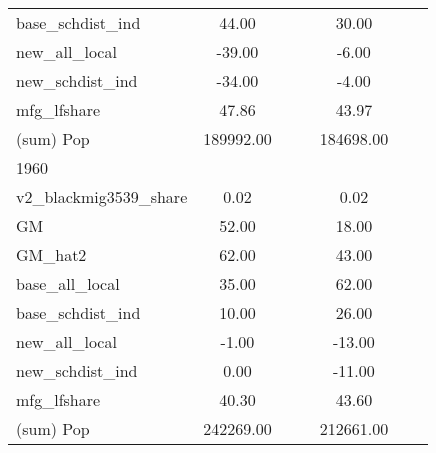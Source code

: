 \begin{table}[htbp]
\begin{tabular}{l*{2}{ccc}}
base\_schdist\_ind    &       44.00&            &            &       30.00&            &            \\
new\_all\_local       &      -39.00&            &            &       -6.00&            &            \\
new\_schdist\_ind     &      -34.00&            &            &       -4.00&            &            \\
mfg\_lfshare         &       47.86&            &            &       43.97&            &            \\
(sum) Pop           &   189992.00&            &            &   184698.00&            &            \\
\midrule
1960                &            &            &            &            &            &            \\
v2\_blackmig3539\_share&        0.02&            &            &        0.02&            &            \\
GM                  &       52.00&            &            &       18.00&            &            \\
GM\_hat2             &       62.00&            &            &       43.00&            &            \\
base\_all\_local      &       35.00&            &            &       62.00&            &            \\
base\_schdist\_ind    &       10.00&            &            &       26.00&            &            \\
new\_all\_local       &       -1.00&            &            &      -13.00&            &            \\
new\_schdist\_ind     &        0.00&            &            &      -11.00&            &            \\
mfg\_lfshare         &       40.30&            &            &       43.60&            &            \\
(sum) Pop           &   242269.00&            &            &   212661.00&            &            \\
\bottomrule
\end{tabular}
\end{table}
